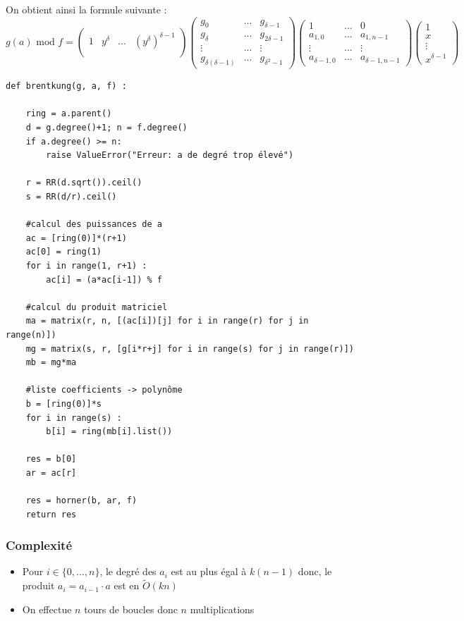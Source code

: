 \documentclass[a4paper]{article}
\begin{document}
On obtient ainsi la formule suivante :
\[
g(a)\text{ mod }f =
\begin{pmatrix}
    1 & y^\delta & ... & (y^\delta)^{\delta-1}  \\  
\end{pmatrix}
\begin{pmatrix}
    g_0 & ... & g_{\delta-1} \\
    g_{\delta} & ... & g_{2\delta-1} \\
    \vdots & ... & \vdots \\
    g_{\delta(\delta-1)} & ... & g_{\delta^2-1}
\end{pmatrix}
\begin{pmatrix}
    1 &  ... & 0 \\
    a_{1,0} & ... & a_{1,n-1} \\
    \vdots &  ... & \vdots \\
    a_{\delta-1,0} & ... & a_{\delta-1,n-1}
\end{pmatrix}
\begin{pmatrix}
    1 \\
    x \\
    \vdots \\
    x^{\delta-1}
\end{pmatrix}
\]


\begin{lstlisting}[title={brent and kung}]
def brentkung(g, a, f) :

	ring = a.parent()
	d = g.degree()+1; n = f.degree()
	if a.degree() >= n:
		raise ValueError("Erreur: a de degré trop élevé")

	r = RR(d.sqrt()).ceil()
	s = RR(d/r).ceil()

    #calcul des puissances de a
	ac = [ring(0)]*(r+1)
	ac[0] = ring(1)
	for i in range(1, r+1) :
		ac[i] = (a*ac[i-1]) % f

    #calcul du produit matriciel
	ma = matrix(r, n, [(ac[i])[j] for i in range(r) for j in range(n)])
	mg = matrix(s, r, [g[i*r+j] for i in range(s) for j in range(r)])
	mb = mg*ma

    #liste coefficients -> polynôme
	b = [ring(0)]*s
	for i in range(s) :
		b[i] = ring(mb[i].list())

	res = b[0]
	ar = ac[r]

	res = horner(b, ar, f)
	return res
\end{lstlisting}

\subsubsection*{Complexité}
\begin{itemize}
    \item Pour $i \in \{0,...,n\}$, le degré des $a_i$ est au plus égal à $k(n-1)$ donc, le produit $a_i=a_{i-1}\cdot a$ est en $\tilde{O}(kn)$
    \item On effectue $n$ tours de boucles donc $n$ multiplications
\end{itemize}
\end{document}
